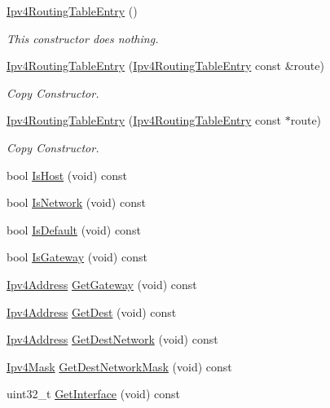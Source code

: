 \begin{DoxyCompactItemize}
\item 
\hyperlink{classns3_1_1Ipv4RoutingTableEntry_a3d6d000918b3b54e0832ebab9f5d6933}{Ipv4\+Routing\+Table\+Entry} ()
\begin{DoxyCompactList}\small\item\em This constructor does nothing. \end{DoxyCompactList}\item 
\hyperlink{classns3_1_1Ipv4RoutingTableEntry_a3469907f8d8855d283f94f1b1c719331}{Ipv4\+Routing\+Table\+Entry} (\hyperlink{classns3_1_1Ipv4RoutingTableEntry}{Ipv4\+Routing\+Table\+Entry} const \&route)
\begin{DoxyCompactList}\small\item\em Copy Constructor. \end{DoxyCompactList}\item 
\hyperlink{classns3_1_1Ipv4RoutingTableEntry_a33e48b88aded6542b89ef9b0e28ed6fd}{Ipv4\+Routing\+Table\+Entry} (\hyperlink{classns3_1_1Ipv4RoutingTableEntry}{Ipv4\+Routing\+Table\+Entry} const $\ast$route)
\begin{DoxyCompactList}\small\item\em Copy Constructor. \end{DoxyCompactList}\item 
bool \hyperlink{classns3_1_1Ipv4RoutingTableEntry_a8bb67aeffffa3c9a411f8da565a0000f}{Is\+Host} (void) const 
\item 
bool \hyperlink{classns3_1_1Ipv4RoutingTableEntry_a6720f58a613586a74db5173c9a4c6e9a}{Is\+Network} (void) const 
\item 
bool \hyperlink{classns3_1_1Ipv4RoutingTableEntry_a324c2d5ea95aee1bdc0df93514dd7568}{Is\+Default} (void) const 
\item 
bool \hyperlink{classns3_1_1Ipv4RoutingTableEntry_aca560d4f36b23ca26aacfc9091001383}{Is\+Gateway} (void) const 
\item 
\hyperlink{classns3_1_1Ipv4Address}{Ipv4\+Address} \hyperlink{classns3_1_1Ipv4RoutingTableEntry_a49dda51e0ba3c78bc969a9378bd15893}{Get\+Gateway} (void) const 
\item 
\hyperlink{classns3_1_1Ipv4Address}{Ipv4\+Address} \hyperlink{classns3_1_1Ipv4RoutingTableEntry_adcd2084c5f0261c43c059c2b981e91fa}{Get\+Dest} (void) const 
\item 
\hyperlink{classns3_1_1Ipv4Address}{Ipv4\+Address} \hyperlink{classns3_1_1Ipv4RoutingTableEntry_a2d63422d5625e3b2ca45d7d65a903e01}{Get\+Dest\+Network} (void) const 
\item 
\hyperlink{classns3_1_1Ipv4Mask}{Ipv4\+Mask} \hyperlink{classns3_1_1Ipv4RoutingTableEntry_a99e54bd42453b548f9910617c1cbec31}{Get\+Dest\+Network\+Mask} (void) const 
\item 
uint32\+\_\+t \hyperlink{classns3_1_1Ipv4RoutingTableEntry_ac460cdc74855bf97cabcd30435b9c713}{Get\+Interface} (void) const 
\end{DoxyCompactItemize}
